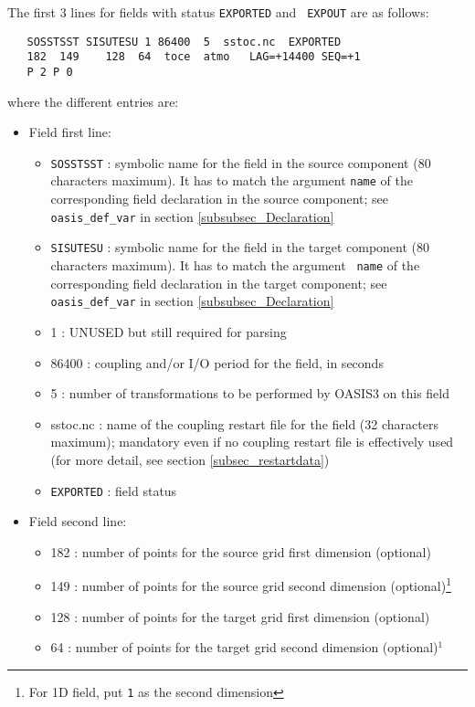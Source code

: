 The first 3 lines for fields with status {\tt EXPORTED} and {\tt
  EXPOUT} are as follows:
  \begin{verbatim}
   SOSSTSST SISUTESU 1 86400  5  sstoc.nc  EXPORTED
   182  149    128  64  toce  atmo   LAG=+14400 SEQ=+1
   P 2 P 0 
\end{verbatim}
where the different entries are:
\begin{itemize}
\item Field first line:
  \begin{itemize}

  \item {\tt SOSSTSST} : symbolic name for the field in the source
    component (80 characters maximum). It has to match the argument {\tt name}
    of the corresponding field declaration in the source component; see
    {\tt oasis\_def\_var} in section \ref{subsubsec_Declaration}
  \item {\tt SISUTESU} : symbolic name for the field in the target
    component (80 characters maximum).  It has to match the argument {\tt
      name} of the corresponding field declaration in the target
    component; see {\tt oasis\_def\_var} in section
    \ref{subsubsec_Declaration}
  \item 1 : UNUSED but still required for parsing
  \item 86400 : coupling and/or I/O period for the field, in seconds
  \item 5 : number of transformations to be performed by OASIS3 on
    this field
  \item sstoc.nc : name of the coupling restart file for the field
    (32 characters maximum); mandatory even if no coupling restart file is
    effectively used (for more detail, see section
    \ref{subsec_restartdata})
  \item {\tt EXPORTED} : field status
  \end{itemize}
\item Field second line:
  \begin{itemize}
  \item 182 : number of points for the source grid first dimension
    (optional)
  \item 149 : number of points for the source grid second dimension
    (optional)\footnote{For 1D field, put {\tt 1} as the second dimension}
  \item 128 : number of points for the target grid first dimension
    (optional)
  \item 64 : number of points for the target grid second dimension
    (optional)$^{1}$


\end{itemize}
\end{itemize}
